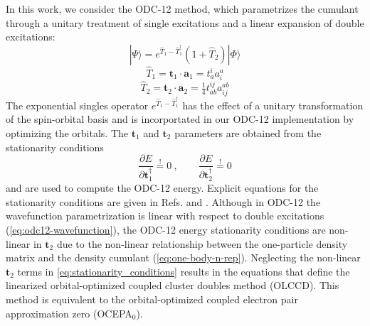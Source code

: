 In this work, we consider the ODC-12
method,\cite{Sokolov:2013p024107,Sokolov:2013p204110} which parametrizes the
cumulant through a unitary treatment of single excitations and a linear
expansion of double excitations:
\begin{equation}
    \label{eq:odc12-wavefunction}
    |\Psi\rangle
    =
    e^{\hat{T}_1-\hat{T}_1^\dagger}
    (1 + \hat{T}_2)
    |\Phi\rangle
\end{equation}
\begin{equation}
    \hat{T}_1
    =
    \mathbf{t}_1\cdot\mathbf{a}_1
    =
    t_a^i
    a^a_i
\end{equation}
\begin{equation}
    \hat{T}_2
    =
    \mathbf{t}_2\cdot\mathbf{a}_2
    =
    \tfrac{1}{4}
    t_{ab}^{ij}
    a^{ab}_{ij}
\end{equation}
The exponential singles operator \(e^{\hat{T}_1-\hat{T}_1^\dagger}\) has the
effect of a unitary transformation of the spin-orbital basis and is
incorportated in our ODC-12 implementation by optimizing the
orbitals.\cite{Sokolov:2013p204110}
The \(\mathbf{t}_1\) and \(\mathbf{t}_2\) parameters are obtained from the
stationarity conditions
\begin{equation}
    \label{eq:stationarity_conditions}
    \dfrac{\partial E}{\partial \mathbf{t}_1^\dagger}
    \overset{!}{=}
    0 \ ,
    \qquad
    \dfrac{\partial E}{\partial \mathbf{t}_2^\dagger}
    \overset{!}{=}
    0
\end{equation}
and are used to compute the ODC-12 energy.
Explicit equations for the stationarity conditions are given in Refs.\@
{} and .
Although in ODC-12 the wavefunction parametrization is linear with respect
to double excitations (\cref{eq:odc12-wavefunction}), the ODC-12 energy
stationarity conditions are non-linear in $\mathbf{t}_2$ due to the non-linear
relationship between the one-particle density matrix and the density cumulant
(\cref{eq:one-body-n-rep}).\cite{Sokolov:2013p024107} Neglecting the non-linear
$\mathbf{t}_2$ terms in \cref{eq:stationarity_conditions} results in the
equations that define the linearized orbital-optimized  coupled cluster doubles
method (OLCCD).
This method is equivalent to the orbital-optimized coupled electron pair
approximation zero (OCEPA$_0$).\cite{Bozkaya:2013p054104}

